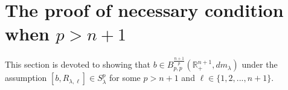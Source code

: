 \documentclass[12pt]{amsart}
\begin{document}
%
%
%
%
%
%



\section{The proof of necessary condition when $p>n+1$}

This section is devoted to showing that $b\in B_{p,p}^{\frac{n+1}{p}}(\mathbb{R}_+^{n+1},dm_\lambda)$ under the assumption $[b,R_{\lambda,\ell}]\in S_\lambda^{p}$ for some $p>n+1$ and $\ell\in\{1,2,...,n+1\}$.
\end{document}

